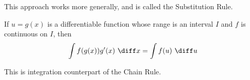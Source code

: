 \begin{frame}
This approach works more generally, and is called the Substitution Rule.
\begin{theorem}
If $u = g(x)$ is a differentiable function whose range is an interval $I$ and $f$ is continuous on $I$, then
\[
\int f(g(x)) g'(x) \ \diff x = \int f(u)\ \diff u
\]
\end{theorem}
This is integration counterpart of the Chain Rule.
\end{frame}

